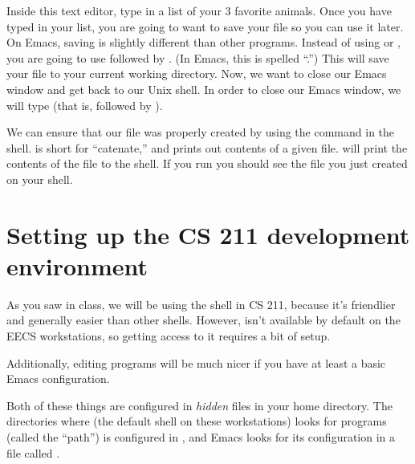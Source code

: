 \documentclass{tufte-handout}
\begin{document}
Inside this text editor, type in a list of your 3 favorite animals. Once
you have typed in your list, you are going to want to save your file so
you can use it later. On Emacs, saving is slightly different than other
programs. Instead of using  or , you
are going to use  followed by
.
(In Emacs, this is spelled ``.'') This will save your
file to your current working directory. Now, we want to close our Emacs
window and get back to our Unix shell. In order to close our Emacs
window, we will type  (that is, 
followed by ).

We can ensure that our file was properly created by using the
 command in the shell.  is short for
``catenate,'' and prints out contents of a given file.   will print the contents of the file to the shell. If
you run  you should see the file you just
created on your shell.

\section{Setting up the CS 211 development environment}

As you saw in class, we will be using the  shell in CS
211, because it’s friendlier and generally easier than other shells.
However,  isn’t available by default on the EECS
workstations, so getting access to it requires a bit of setup.

Additionally, editing programs will be much nicer if you have at least a
basic Emacs configuration.

Both of these things are configured in \emph{hidden} files in your home directory. The
directories where  (the default shell on these
workstations) looks for programs (called the ``path'') is configured in
, and Emacs looks for its configuration in a file
called .
\end{document}

